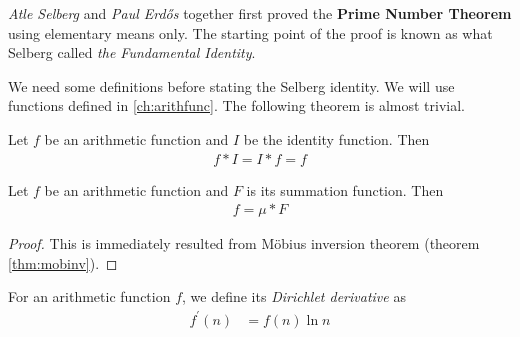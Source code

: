 \documentclass{subfile}
\begin{document}
	\textit{Atle Selberg} and \textit{Paul Erd\H{o}s} together first proved the \textbf{Prime Number Theorem} using elementary means only. The starting point of the proof is known as what Selberg called \textit{the Fundamental Identity}.

	We need some definitions before stating the Selberg identity. We will use functions defined in \autoref{ch:arithfunc}. The following theorem is almost trivial.
	\begin{theorem}
		Let $f$ be an arithmetic function and $I$ be the identity function. Then
			\begin{align*}
				f\ast I=I\ast f=f
			\end{align*}
	\end{theorem}

	\begin{theorem}
		\label{thm:dirichmobi}
		Let $f$ be an arithmetic function and $F$ is its summation function. Then
			\begin{align*}
				f=\mu\ast F
			\end{align*}
	\end{theorem}

	\begin{proof}
		This is immediately resulted from M\" obius inversion theorem (theorem \eqref{thm:mobinv}).
	\end{proof}

	\begin{definition}
		For an arithmetic function $f$, we define its \textit{Dirichlet derivative} as
			\begin{align*}
				f^\prime(n) & =f(n)\ln n
			\end{align*}
	\end{definition}
\end{document}
